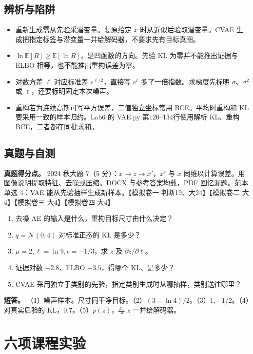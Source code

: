 \documentclass[UTF8,a4paper,zihao=-4,fontset=fandol]{ctexart}
\begin{document}
\subsection{辨析与陷阱}

\begin{itemize}
\item 重新生成需从先验采潜变量。复原给定 $x$ 时从近似后验取潜变量。CVAE 生成把指定标签与潜变量一并给解码器，不要求先有目标真图。
\item $\ln\mathbb E[R]\ge\mathbb E[\ln R]$，是凹函数的方向。先验 KL 为零并不能推出证据与 ELBO 相等，也不能推出重构误差为零。
\item 对数方差 $\ell$ 对应标准差 $e^{\ell/2}$，直接写 $e^\ell$ 多了一倍指数。求梯度先标明 $\sigma$、$\sigma^2$ 或 $\ell$，还要标明固定本次噪声。
\item 重构若为连续高斯可写平方误差，二值独立坐标常用 BCE。平均时重构和 KL 要采用一致的样本归约。Lab6 的 VAE.py 第120--134行使用解析 KL、重构 BCE，二者都在同批求和。
\end{itemize}

\subsection{真题与自测}

\textbf{真题得分点。} 2024 秋大题 7（5 分）：$x\to z\to x'$，$x'$ 与 $x$ 同维以计算误差。用图像说明提取特征、去噪或压缩。DOCX 与参考答案均载，PDF 回忆漏题。范本单选 4：VAE 能从先验抽样生成新样本。【模拟卷一 判断19、大24】【模拟卷二 大4】【模拟卷三 大4】【模拟卷四 大4】

\begin{enumerate}
\item 去噪 AE 的输入是什么，重构目标尺寸由什么决定？
\item $q=\mathcal N(0,4)$ 对标准正态的 KL 是多少？
\item $\mu=2,\ell=\ln9,\epsilon=-1/3$，求 $z$ 及 $\partial z/\partial\ell$。
\item 证据对数 $-2.8$、ELBO $-3.5$，得哪个 KL、是多少？
\item CVAE 采用独立于类别的先验，指定类别生成时从哪抽样，类别送往哪里？
\end{enumerate}
\textbf{短答。} （1）噪声样本。尺寸同干净目标。（2）$(3-\ln4)/2$。（3）$1,-1/2$。（4）对真实后验的 KL，$0.7$。（5）$p(z)$，与 $z$ 一并给解码器。

\section{六项课程实验}
\end{document}
